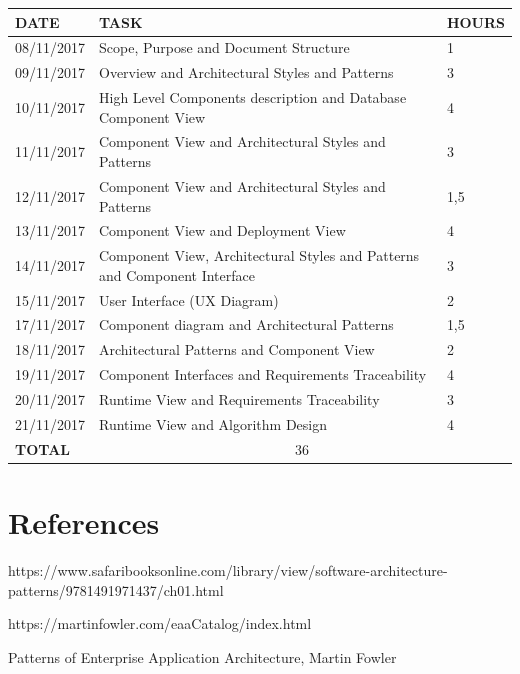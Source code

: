 \documentclass[12pt]{article}
\begin{document}
\begin{center}
\begin{tabular}{ |p{}|p{}|p{}| } 
 \hline
 \textbf{DATE} & \textbf{TASK} & \textbf{HOURS} \\ 
  \hline
 08/11/2017 &  Scope, Purpose and Document Structure & 1 \\ 
  \hline
 09/11/2017 & Overview and Architectural Styles and Patterns & 3 \\
  \hline
  10/11/2017 & High Level Components description and Database Component View & 4 \\ 
  \hline
  11/11/2017 & Component View and Architectural Styles and Patterns & 3 \\ 
  \hline
  12/11/2017 & Component View and Architectural Styles and Patterns & 1,5 \\ 
  \hline
  13/11/2017 & Component View and Deployment View & 4 \\ 
  \hline
  14/11/2017 & Component View, Architectural Styles and Patterns and Component Interface & 3 \\ 
  \hline
  15/11/2017 & User Interface (UX Diagram) & 2 \\ 
  \hline
  17/11/2017 & Component diagram and Architectural Patterns & 1,5 \\
  \hline
  18/11/2017 & Architectural Patterns and Component View & 2 \\
  \hline
  19/11/2017 & Component Interfaces and Requirements Traceability & 4 \\
  \hline
  20/11/2017 & Runtime View and Requirements Traceability & 3 \\
  \hline
  21/11/2017 & Runtime View and Algorithm Design & 4 \\
  \hline
  \textbf{TOTAL} & \multicolumn{2}{c|}{36} \\ 
  \hline
\end{tabular}
\end{center}

\section{References}
https://www.safaribooksonline.com/library/view/software-architecture-patterns/9781491971437/ch01.html

https://martinfowler.com/eaaCatalog/index.html

Patterns of Enterprise Application Architecture, Martin Fowler
\end{document}
